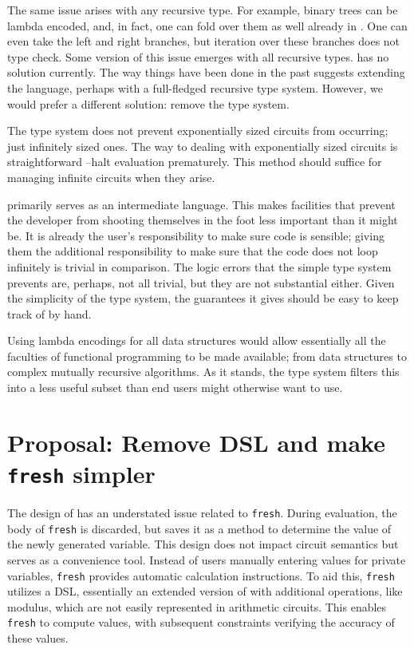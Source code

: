 \documentclass[
    9pt,            
    techreport,       
    affiltop,       
]{art}
\begin{document}
The same issue arises with any recursive type. For example, binary trees can be lambda encoded, and, in fact, one can fold over them as well already in \VampIR{}. One can even take the left and right branches, but iteration over these branches does not type check. Some version of this issue emerges with all recursive types. \VampIR{} has no solution currently. The way things have been done in the past suggests extending the language, perhaps with a full-fledged recursive type system. However, we would prefer a different solution: remove the type system.

The type system does not prevent exponentially sized circuits from occurring; just infinitely sized ones. The way to dealing with exponentially sized circuits is straightforward --halt evaluation prematurely. This method should suffice for managing infinite circuits when they arise.


\VampIR{} primarily serves as an intermediate language. This makes facilities that prevent the developer from shooting themselves in the foot less important than it might be. It is already the user's responsibility to make sure \VampIR{} code is sensible; giving them the additional responsibility to make sure that the code does not loop infinitely is trivial in comparison. The logic errors that the simple type system prevents are, perhaps, not all trivial, but they are not substantial either. Given the simplicity of the type system, the guarantees it gives should be easy to keep track of by hand.

Using lambda encodings for all data structures would allow essentially all the faculties of functional programming to be made available; from data structures to complex mutually recursive algorithms. As it stands, the type system filters this into a less useful subset than end users might otherwise want to use.

\section{Proposal: Remove DSL and make \texttt{fresh} simpler}\label{sec:removal-dsl}

The design of \VampIR{} has an understated issue related to \texttt{fresh}. During evaluation, the body of \texttt{fresh} is discarded, but \VampIR{} saves it as a method to determine the value of the newly generated variable. This design does not impact circuit semantics but serves as a convenience tool. Instead of users manually entering values for private variables, \texttt{fresh} provides automatic calculation instructions. To aid this, \texttt{fresh} utilizes a DSL, essentially an extended version of \VampIR{} with additional operations, like modulus, which are not easily represented in arithmetic circuits. This enables \texttt{fresh} to compute values, with subsequent constraints verifying the accuracy of these values.
\end{document}
